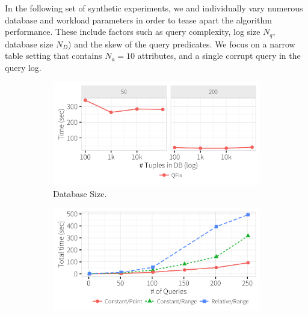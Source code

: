 In the following set of synthetic experiments, we  and
individually vary numerous database and workload parameters in order to tease apart the algorithm performance.  
These include factors such as query complexity, log size $N_q$, database size $N_D$) and the skew of the query predicates.
We focus on a narrow table setting that contains $N_a = 10$ attributes, and a single corrupt query in the query log.
  \begin{figure}[h]
    \vspace*{-.1in}
    \centering
     \begin{subfigure}[t]{.3\textwidth}
      \includegraphics[width = .99\columnwidth]{figures/dbsize_time}
      \vspace*{-.2in}
      \caption{Database Size.}
      \label{f:dbsize_time} 
    \end{subfigure}
        \begin{subfigure}[t]{.3\textwidth}
      \includegraphics[width = .99\columnwidth]{figures/pointrelv_time}

\end{subfigure}
\end{figure}
